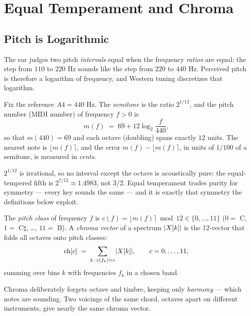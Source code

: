 \chapter{Equal Temperament and Chroma}\label{ch:temperament}

\section{Pitch is Logarithmic}

The ear judges two pitch \emph{intervals} equal when the frequency
\emph{ratios} are equal: the step from $110$ to $220$ Hz sounds like the
step from $220$ to $440$ Hz. Perceived pitch is therefore a logarithm of
frequency, and Western tuning discretizes that logarithm.

\begin{definition}\label{def:tet}
Fix the reference $A4 = 440$ Hz. The \emph{semitone} is the ratio
$2^{1/12}$, and the pitch number (MIDI number) of frequency $f > 0$ is
\[
m(f) \;=\; 69 + 12 \log_2\!\frac{f}{440},
\]
so that $m(440) = 69$ and each octave (doubling) spans exactly $12$ units.
The nearest note is $\lfloor m(f) \rceil$, and the error
$m(f) - \lfloor m(f) \rceil$, in units of $1/100$ of a semitone, is measured
in \emph{cents}.
\end{definition}

\begin{remark}
$2^{1/12}$ is irrational, so no interval except the octave is acoustically
pure: the equal-tempered fifth is $2^{7/12} \approx 1.4983$, not $3/2$. Equal
temperament trades purity for symmetry --- every key sounds the same --- and
it is exactly that symmetry the definitions below exploit.
\end{remark}

\begin{definition}\label{def:chroma}
The \emph{pitch class} of frequency $f$ is
$c(f) = \lfloor m(f) \rceil \bmod 12 \in \{0, \dots, 11\}$ ($0 = $ C,
$1 = $ C$\sharp$, \dots, $11 = $ B). A \emph{chroma vector} of a spectrum
$\lvert X[k]\rvert$ is the 12-vector that folds all octaves onto pitch classes:
\[
\text{ch}[c] \;=\; \sum_{k \,:\, c(f_k) = c} \lvert X[k]\rvert,
\qquad c = 0, \dots, 11,
\]
summing over bins $k$ with frequencies $f_k$ in a chosen band.
\end{definition}

Chroma deliberately forgets octave and timbre, keeping only \emph{harmony}
--- which notes are sounding. Two voicings of the same chord, octaves apart
on different instruments, give nearly the same chroma vector.

